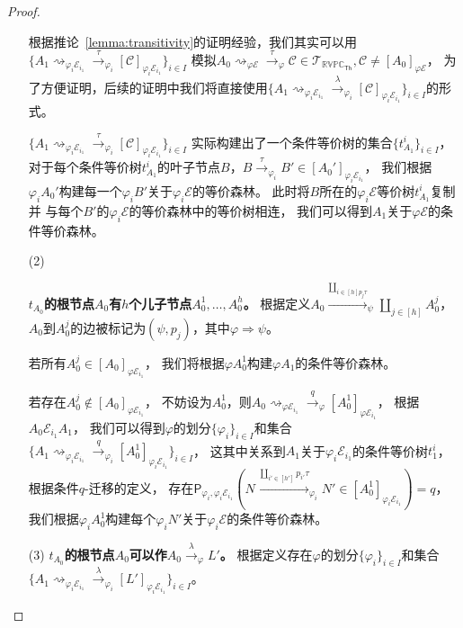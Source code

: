 \begin{proof}
\begin{itemize}
{         根据推论~\ref{lemma:transitivity}的证明经验，我们其实可以用$\{A_1\rightsquigarrow_{\varphi_i\mathcal{E}_{i_1}}\stackrel{\tau}{\rightarrow}_{\varphi_i}[\mathcal{C}]_{\varphi_i\mathcal{E}_{i_1}}\}_{i\in I}$
         模拟$A_0\rightsquigarrow_{\varphi\mathcal{E}}\stackrel{\tau}{\rightarrow}_{\varphi} \mathcal{C}\in \mathcal{T}_{\mathbb{RVPC}_{\mathsf{Th}}},\mathcal{C}\neq [A_0]_{\varphi\mathcal{E}}$，
         为了方便证明，后续的证明中我们将直接使用$\{A_1\rightsquigarrow_{\varphi_i\mathcal{E}_{i_1}}\stackrel{\lambda}{\rightarrow}_{\varphi_i}[\mathcal{C}]_{\varphi_i\mathcal{E}_{i_1}}\}_{i\in I}$的形式。
         
         $\{A_1\rightsquigarrow_{\varphi_i\mathcal{E}_{i_1}}\stackrel{\tau}{\rightarrow}_{\varphi_i}[\mathcal{C}]_{\varphi_i\mathcal{E}_{i_1}}\}_{i\in I}$
         实际构建出了一个条件等价树的集合$\{t_{A_1}^{i}\}_{i\in I}$，
         对于每个条件等价树$t_{A_1}^i$的叶子节点$B$，$B\stackrel{\tau}{\rightarrow}_{\varphi_i}B'\in [A_0']_{\varphi_i\mathcal{E}_{i_1}}$，
         我们根据$\varphi_i A_0'$构建每一个$\varphi_i B'$关于$\varphi_i\mathcal{E}$的等价森林。
         此时将$B$所在的$\varphi_i\mathcal{E}$等价树$t_{A_1}^{i}$复制并
         与每个$B'$的$\varphi_i\mathcal{E}$的等价森林中的等价树相连，
         我们可以得到$A_1$关于$\varphi\mathcal{E}$的条件等价森林。
      }
      \item[(2)] {
         \textbf{$t_{A_0}$的根节点$A_0$有$h$个儿子节点$A_0^1,\dots,A_0^h$。}
         根据定义$A_0\stackrel{\coprod_{i\in [h]p_j\tau}}{\rightarrow}_{\psi} \coprod_{j\in [h]}A_0^j$，
         $A_0$到$A_0^j$的边被标记为$(\psi, p_j)$，其中$\varphi\Rightarrow\psi$。

         若所有$A_0^j\in [A_0]_{\varphi\mathcal{E}_{i_1}}$，
         我们将根据$\varphi A_0^1$构建$\varphi A_1$的条件等价森林。

         若存在$A_0^j\notin [A_0]_{\varphi\mathcal{E}_{i_1}}$，
         不妨设为$A_0^1$，则$A_0\rightsquigarrow_{\varphi\mathcal{E}_{i_1}}\stackrel{q}{\rightarrow}_{\varphi} [A_0^1]_{\varphi\mathcal{E}_{i_1}}$，
         根据$A_0\mathcal{E}_{i_1}A_1$，
         我们可以得到$\varphi$的划分$\{\varphi_i\}_{i\in I}$和集合
         $\{A_1\rightsquigarrow_{\varphi_i\mathcal{E}_{i_1}}\stackrel{q}{\rightarrow}_{\varphi_i} [A_0^1]_{\varphi_i\mathcal{E}_{i_1}}\}_{i\in I}$，
         这其中关系到$A_1$关于$\varphi_i\mathcal{E}_{i_1}$的条件等价树$t_1^i$，
         根据条件$q$-迁移的定义，
         存在$\mathsf{P}_{\varphi_i,\varphi_i\mathcal{E}_{i_1}}(N\stackrel{\coprod_{i'\in [h']}p_{i'}\tau}{\longrightarrow}_{\varphi_i} N'\in [A_0^1]_{\varphi_i\mathcal{E}_{i_1}}) = q$，
         我们根据$\varphi_i A_0^1$构建每个$\varphi_i N'$关于$\varphi_i\mathcal{E}$的条件等价森林。
      }
      \item[(3)] {
         \textbf{$t_{A_0}$的根节点$A_0$可以作$A_0\stackrel{\lambda}{\rightarrow}_{\varphi} L'$。}
         根据定义存在$\varphi$的划分$\{\varphi_i\}_{i\in I}$和集合
         $\{A_1\rightsquigarrow_{\varphi_i\mathcal{E}_{i_1}}\stackrel{\lambda}{\rightarrow}_{\varphi_i} [L']_{\varphi_i\mathcal{E}_{i_1}}\}_{i\in I}$。
      }
   \end{itemize}


\end{proof}
